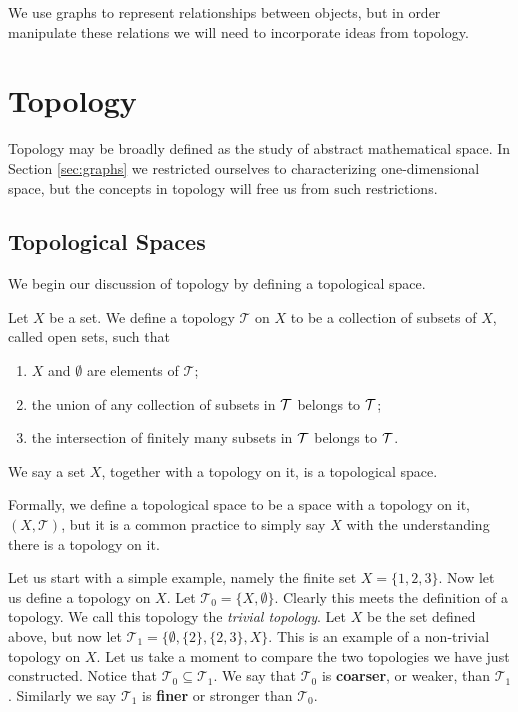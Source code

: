 We use graphs to represent relationships between objects, but in order manipulate these relations we will need to incorporate ideas from topology.


\section{Topology}\label{sec:topology}
Topology may be broadly defined as the study of abstract mathematical space. In Section \ref{sec:graphs} we restricted ourselves to characterizing one-dimensional space, but the concepts in topology will free us from such restrictions. 

\subsection{Topological Spaces}

We begin our discussion of topology by defining a topological space.
\begin{defn}
Let $X$ be a set. We define a topology $\mathcal{T}$ on $X$ to be a collection of subsets of $X$, called open sets, such that
\begin{enumerate}
\item $X$ and $\emptyset$ are elements of $\mathcal{T}$;\
\item the union of any collection of subsets in $\mathcal{T}$ belongs to $\mathcal{T}$;\
\item the intersection of finitely many subsets in $\mathcal{T}$ belongs to $\mathcal{T}$.
\end{enumerate}
We say a set $X$, together with a topology on it, is a topological space.
\end{defn}


Formally, we define a topological space to be a space with a topology on it, $(X,\mathcal{T})$, but it is a common practice to simply say $X$ with the understanding there is a topology on it.

Let us start with a simple example, namely the finite set $X=\{1,2,3\}$. Now let us define a topology on $X$. Let $\mathcal{T}_0=\{X,\emptyset\}$. Clearly this meets the definition of a topology. We call this topology the \textit{trivial topology}. Let $X$ be the set defined above, but now let $\mathcal{T}_1=\{\emptyset, \{2\}, \{2,3\}, X\}$. This is an example of a non-trivial topology on $X$. Let us take a moment to compare the two topologies we have just constructed. Notice that $\mathcal{T}_0 \subseteq \mathcal{T}_1$. We say that $\mathcal{T}_0$ is \textbf{coarser}, or weaker, than $\mathcal{T}_1$. Similarly we say $\mathcal{T}_1$ is \textbf{finer} or stronger than $\mathcal{T}_0$. 

